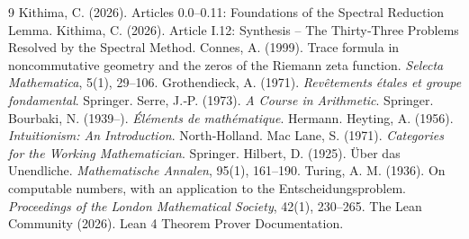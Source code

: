 \documentclass[11pt,a4paper]{article}
\begin{document}

\begin{thebibliography}{9}
  Kithima, C. (2026). Articles 0.0–0.11: Foundations of the Spectral Reduction Lemma.
  Kithima, C. (2026). Article I.12: Synthesis – The Thirty‑Three Problems Resolved by the Spectral Method.
  Connes, A. (1999). Trace formula in noncommutative geometry and the zeros of the Riemann zeta function. \emph{Selecta Mathematica}, 5(1), 29–106.
  Grothendieck, A. (1971). \emph{Revêtements étales et groupe fondamental}. Springer.
  Serre, J.‑P. (1973). \emph{A Course in Arithmetic}. Springer.
  Bourbaki, N. (1939–). \emph{Éléments de mathématique}. Hermann.
  Heyting, A. (1956). \emph{Intuitionism: An Introduction}. North‑Holland.
  Mac Lane, S. (1971). \emph{Categories for the Working Mathematician}. Springer.
  Hilbert, D. (1925). Über das Unendliche. \emph{Mathematische Annalen}, 95(1), 161–190.
  Turing, A. M. (1936). On computable numbers, with an application to the Entscheidungsproblem. \emph{Proceedings of the London Mathematical Society}, 42(1), 230–265.
  The Lean Community (2026). Lean 4 Theorem Prover Documentation.
\end{thebibliography}
\end{document}
